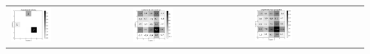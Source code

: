         \begin{tabular}{p{5.3cm}p{5.3cm}p{5.3cm}}
                	\includegraphics[width=0.36\textwidth, height=0.2\textheight]{pic/radonInp.png}
                    & 
                    \includegraphics[width=0.36\textwidth, height=0.2\textheight]{pic/radonGef.png}
                    &
                  	\includegraphics[width=0.355\textwidth, height=0.19\textheight]{pic/radonUngef.png}                                     
         \end{tabular}
         \label{dfd:Radon}
         \vspace{3mm}  
        